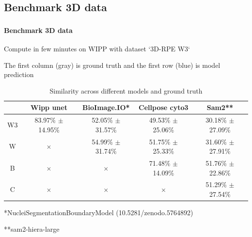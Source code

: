 \def\slidetitle{Benchmark 3D data}

\subsection{\slidetitle}
\begin{frame}
  \frametitle{\sectiontitle}
  \framesubtitle{\slidetitle}

  Compute in few minutes on WIPP with dataset `3D-RPE W3`

  The first column (gray) is ground truth and the first row (blue) is model prediction

  \begin{center}
    \begin{table}
      \begin{tabular}{|c|c|c|c|c|}
       \hline
       \rowcolor{tableFirstRowColor}      & Wipp unet             & BioImage.IO*          & Cellpose cyto3        & Sam2**   \\ [0.5ex]
       \hline
       \cellcolor{tableFirstColColor} W3  & 83.97\% $\pm$ 14.95\% & 52.05\% $\pm$ 31.57\% & 49.53\% $\pm$ 25.06\% & 30.18\% $\pm$ 27.09\% \\
       \hline
       \cellcolor{tableFirstColColor} W   & $\times$              & 54.99\% $\pm$ 31.74\% & 51.75\% $\pm$ 25.33\% & 31.60\% $\pm$ 27.91\% \\
       \hline
       \cellcolor{tableFirstColColor} B   & $\times$              & $\times$              & 71.48\% $\pm$ 14.09\% & 51.76\% $\pm$ 22.86\% \\
       \hline
       \cellcolor{tableFirstColColor} C   & $\times$              & $\times$              & $\times$              & 51.29\% $\pm$ 27.54\% \\
       \hline
      \end{tabular}
      \caption{Similarity across different models and ground truth}
    \end{table}
  \end{center}

  *NucleiSegmentationBoundaryModel (10.5281/zenodo.5764892)

  **sam2-hiera-large

\end{frame}

\def\slidetitle{Explaining poor 3D results}

